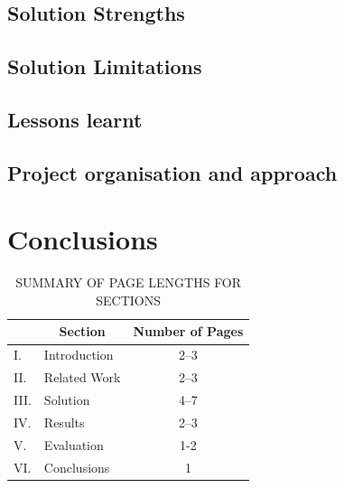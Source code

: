 \documentclass[12pt,a4paper]{article}
\begin{document}
\subsection{Solution Strengths}

\subsection{Solution Limitations}

\subsection{Lessons learnt}

\subsection{Project organisation and approach}




\section{Conclusions}



\begin{table}[htb]
\centering
\caption{SUMMARY OF PAGE LENGTHS FOR SECTIONS}
\vspace*{6pt}
\label{summary}
\begin{tabular}{|ll|c|} \hline
& \multicolumn{1}{c|}{\bf Section} & {\bf Number of Pages} \\ \hline
I. & Introduction & 2--3 \\ \hline
II. & Related Work & 2--3 \\ \hline
III. & Solution & 4--7 \\ \hline
IV. & Results & 2--3 \\ \hline
V. & Evaluation & 1-2 \\ \hline
VI. & Conclusions & 1 \\ \hline
\end{tabular}
\end{table}



\end{document}
